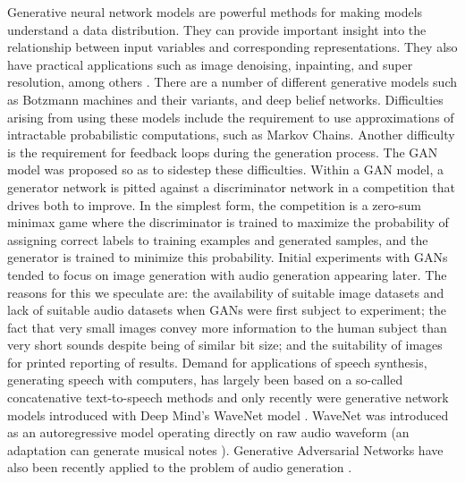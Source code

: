 \documentclass[a4paper, titlepage]{article}
\begin{document}
Generative neural network models are powerful methods for making models understand a data distribution.
They can provide important insight into the relationship between input variables and corresponding representations.
They also have practical applications such as image denoising, inpainting, and super resolution, among others \cite{openai_blog_2017}.
\newline
\newline
There are a number of different generative models such as Botzmann machines and their variants, and deep belief networks.
Difficulties arising from using these models include the requirement to use approximations of intractable probabilistic computations, such as Markov Chains.
Another difficulty is the requirement for feedback loops during the generation process.
The GAN model was proposed so as to sidestep these difficulties.
\newline
\newline
Within a GAN model, a generator network is pitted against a discriminator network in a competition that drives both to improve.
In the simplest form, the competition is a zero-sum minimax game where the discriminator is trained to maximize the probability of assigning correct labels to training examples and generated samples, and the generator is trained to minimize this probability.
\newline
\newline
Initial experiments with GANs tended to focus on image generation with audio generation appearing later.
The reasons for this we speculate are: the availability of suitable image datasets and lack of suitable audio datasets when GANs were first subject to experiment; the fact that very small images convey more information to the human subject than very short sounds despite being of similar bit size; and the suitability of images for printed reporting of results.
\newline
\newline
Demand for applications of speech synthesis, generating speech with computers, has largely been based on a so-called concatenative text-to-speech methods and only recently were generative network models introduced with Deep Mind's WaveNet model \cite{waveNetUrl}.
WaveNet was introduced as an autoregressive model operating directly on raw audio waveform \cite{DBLP:journals/corr/OordDZSVGKSK16} (an adaptation can generate musical notes \cite{2017arXiv170401279E}).
\newline
\newline
Generative Adversarial Networks have also been recently applied to the problem of audio generation \cite{2018arXiv180204208D}.
\end{document}
